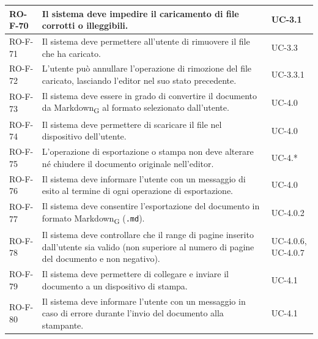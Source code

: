 \documentclass[11pt,a4paper]{article}
\newcommand{\gls}[1]{#1\textsubscript{G}}
\begin{document}
\begin{longtable}{|p{}|>{\raggedright\arraybackslash}p{}|p{}|}
\hline
RO-F-70 & Il sistema deve impedire il caricamento di file corrotti o illeggibili. & UC-3.1 \\
\hline
RO-F-71 & Il sistema deve permettere all'utente di rimuovere il file che ha caricato. & UC-3.3 \\
\hline
RO-F-72 & L'utente può annullare l'operazione di rimozione del file caricato, lasciando l'editor nel suo stato precedente. & UC-3.3.1 \\
\hline
RO-F-73 & Il sistema deve essere in grado di convertire il documento da \gls{Markdown} al formato selezionato dall'utente. & UC-4.0 \\
\hline
RO-F-74 & Il sistema deve permettere di scaricare il file nel dispositivo dell'utente. & UC-4.0 \\
\hline
RO-F-75 & L'operazione di esportazione o stampa non deve alterare né chiudere il documento originale nell'editor. & UC-4.* \\
\hline
RO-F-76 & Il sistema deve informare l'utente con un messaggio di esito al termine di ogni operazione di esportazione. & UC-4.0 \\
\hline
RO-F-77 & Il sistema deve consentire l'esportazione del documento in formato \gls{Markdown} (\texttt{.md}). & UC-4.0.2 \\
\hline
RO-F-78 & Il sistema deve controllare che il range di pagine inserito dall'utente sia valido (non superiore al numero di pagine del documento e non negativo). & UC-4.0.6, UC-4.0.7 \\
\hline
RO-F-79 & Il sistema deve permettere di collegare e inviare il documento a un dispositivo di stampa. & UC-4.1 \\
\hline
RO-F-80 & Il sistema deve informare l'utente con un messaggio in caso di errore durante l'invio del documento alla stampante. & UC-4.1 \\
\hline


\end{longtable}
\end{document}
